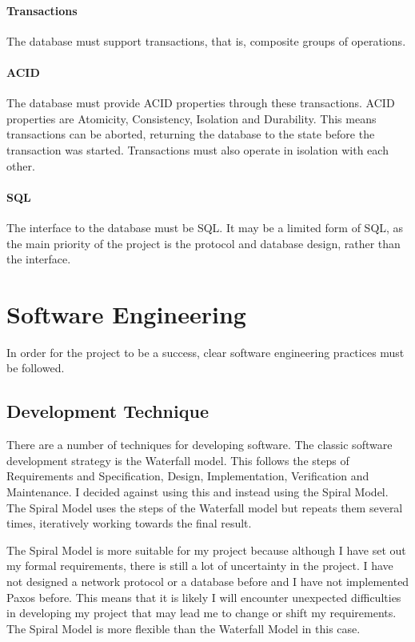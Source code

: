\documentclass[12pt,twoside,notitlepage]{report}
\begin{document}
\paragraph{Transactions} The database must support transactions, that is, composite groups of operations.
\paragraph{ACID} The database must provide ACID properties through these transactions. ACID
properties are Atomicity, Consistency, Isolation and Durability. This means transactions can be
aborted, returning the database to the state before the transaction was started. Transactions must
also operate in isolation with each other.
\paragraph{SQL} The interface to the database must be SQL. It may be a limited form of SQL, as the
main priority of the project is the protocol and database design, rather than the interface.

\section{Software Engineering}

In order for the project to be a success, clear software engineering practices must be followed.

\subsection{Development Technique}

There are a number of techniques for developing software. The classic software development
strategy is the Waterfall model. This follows the steps of Requirements and Specification, Design,
Implementation, Verification and Maintenance. I decided against using this and instead using the
Spiral Model. The Spiral Model uses the steps of the Waterfall model but repeats them several
times, iteratively working towards the final result.

The Spiral Model is more suitable for my project because although I have set out my formal
requirements, there is still a lot of uncertainty in the project. I have not designed a network
protocol or a database before and I have not implemented Paxos before. This means that it is
likely I will encounter unexpected difficulties in developing my project that may lead me to
change or shift my requirements. The Spiral Model is more flexible than the Waterfall Model in
this case.
\end{document}
